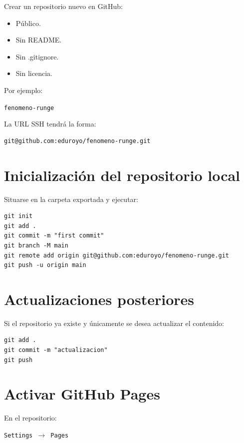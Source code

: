 \documentclass[11pt,a4paper]{article}
\begin{document}
Crear un repositorio nuevo en GitHub:

\begin{itemize}
	\item Público.
	\item Sin README.
	\item Sin .gitignore.
	\item Sin licencia.
\end{itemize}

Por ejemplo:

\begin{center}
\texttt{fenomeno-runge}
\end{center}

La URL SSH tendrá la forma:

\begin{lstlisting}
git@github.com:eduroyo/fenomeno-runge.git
\end{lstlisting}

\section{Inicialización del repositorio local}

Situarse en la carpeta exportada y ejecutar:

\begin{lstlisting}
git init
git add .
git commit -m "first commit"
git branch -M main
git remote add origin git@github.com:eduroyo/fenomeno-runge.git
git push -u origin main
\end{lstlisting}

\section{Actualizaciones posteriores}

Si el repositorio ya existe y únicamente se desea actualizar el contenido:

\begin{lstlisting}
git add .
git commit -m "actualizacion"
git push
\end{lstlisting}

\section{Activar GitHub Pages}

En el repositorio:

\begin{center}
\texttt{Settings $\rightarrow$ Pages}
\end{center}
\end{document}
